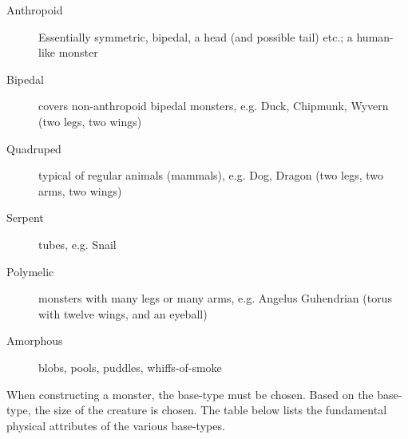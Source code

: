 \documentclass[twoside]{book}
\begin{document}
\begin{description}
    
  \item[Anthropoid] 
    {  
    Essentially symmetric,
                 bipedal, a head (and possible tail) etc.; a human-like
                 monster 
    }
  
  \item[Bipedal] 
    {  
    covers non-anthropoid
                 bipedal monsters, e.g. Duck, Chipmunk, Wyvern (two legs,
                 two wings) 
    }
  
  \item[Quadruped] 
    {  
    typical of regular
                 animals (mammals), e.g. Dog, Dragon (two legs, two arms,
                 two wings) 
    }
  
  \item[Serpent] 
    {  
    tubes, e.g. Snail
    }
  
  \item[Polymelic] 
    {  
    monsters with many legs
                 or many arms, e.g. Angelus Guhendrian (torus with twelve
                 wings, and an eyeball)
    }
  
  \item[Amorphous] 
    {  
    blobs, pools, puddles,
                 whiffs-of-smoke 
    }
  
\end{description}
  
    {  
    When constructing a monster, the base-type must be
               chosen. Based on the base-type, the size of the creature
               is chosen. The table below lists the fundamental physical
               attributes of the various base-types. 
    }
  
\end{document}
